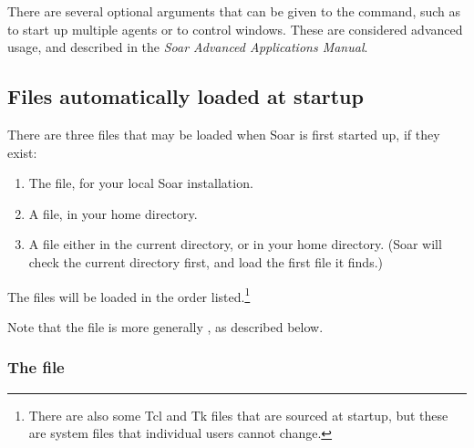 {There are several optional arguments that can be given to the 
command, such as to start up multiple agents or to control windows. These are
considered advanced usage, and described in the \emph{Soar Advanced
Applications Manual}.


\subsection{Files automatically loaded at startup}
\label{INTERFACE-files}



There are three files that may be loaded when Soar is first started up, if
they exist:\vspace{-12pt}
\begin{enumerate}
\item The  file, for your local Soar
	installation.\vspace{-6pt}
\item A  file, in your home directory.\vspace{-6pt}
\item A  file either in the current directory, or in your home
	directory. (Soar will check the current directory first, and load the
	first  file it finds.)
\end{enumerate}

The files will be loaded in the order listed.\footnote{There are also some Tcl
and Tk files that are sourced at startup, but these are system files that
individual users cannot change.}

Note that the  file is more generally
, as described below.


\subsubsection*{The  file}

}
